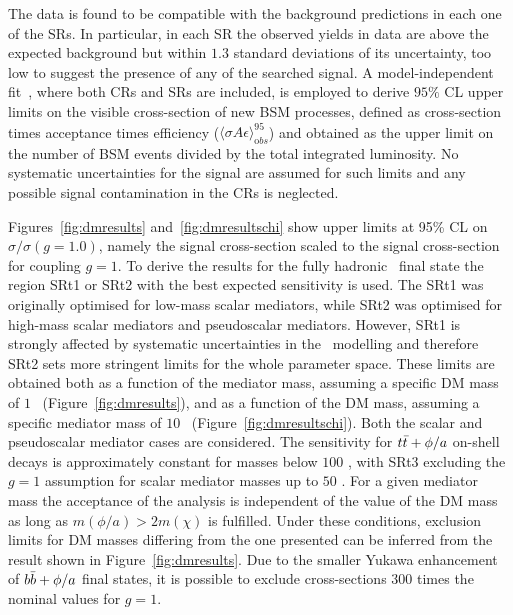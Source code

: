 		The data is found to be compatible with the background predictions in each one of the \acp{SR}. In particular, in each \ac{SR} the observed yields in data are above the expected background but within $1.3$ standard deviations of its uncertainty, too low to suggest the presence of any of the searched signal. A model-independent fit~\cite{histfitter}, where both \acp{CR} and \acp{SR} are included, is employed to derive $95\%$ \ac{CL} upper limits on the visible cross-section of new \ac{BSM} processes, defined as cross-section times acceptance times efficiency ($\langle\sigma A \epsilon\rangle_{\mathrm obs}^{95}$) and obtained as the upper limit on the number of BSM events divided by the total integrated luminosity. No systematic uncertainties for the signal are assumed for such limits and any possible signal contamination in the \acp{CR} is neglected. %

		Figures~\ref{fig:dmresults} and~\ref{fig:dmresultschi} show upper limits at 95\% CL on $\sigma / \sigma (g = 1.0)$, namely the signal cross-section scaled to the signal cross-section for coupling $g = 1$. To derive the results for the fully hadronic \ttbar\ final state the region SRt1 or SRt2 with the best expected sensitivity is used. The SRt1 was originally optimised for low-mass scalar mediators, while SRt2 was optimised for high-mass scalar mediators and pseudoscalar mediators. However, SRt1 is strongly affected by systematic uncertainties in the \ttbar\ modelling and therefore SRt2 sets more stringent limits for the whole parameter space. These limits are obtained both as a function of the mediator mass, assuming a specific \ac{DM} mass of $1$ \GeV\ (Figure~\ref{fig:dmresults}), and as a function of the \ac{DM} mass, assuming a specific mediator mass of $10$ \GeV\ (Figure~\ref{fig:dmresultschi}). Both the scalar and pseudoscalar mediator cases are considered. The sensitivity for $t\bar{t} + \phi/a$ on-shell decays is approximately constant for masses below $100$ \GeV, with SRt3 excluding the $g = 1$ assumption for scalar mediator masses up to $50$ \GeV. For a given mediator mass the acceptance of the analysis is independent of the value of the \ac{DM} mass as long as $m(\phi / a) > 2  m(\chi)$ is fulfilled. Under these conditions, exclusion limits for \ac{DM} masses differing from the one presented can be inferred from the result shown in Figure~\ref{fig:dmresults}. Due to the smaller Yukawa enhancement of $b\bar{b} + \phi / a$ final states, it is possible to exclude cross-sections $300$ times the nominal values for $g = 1$.


